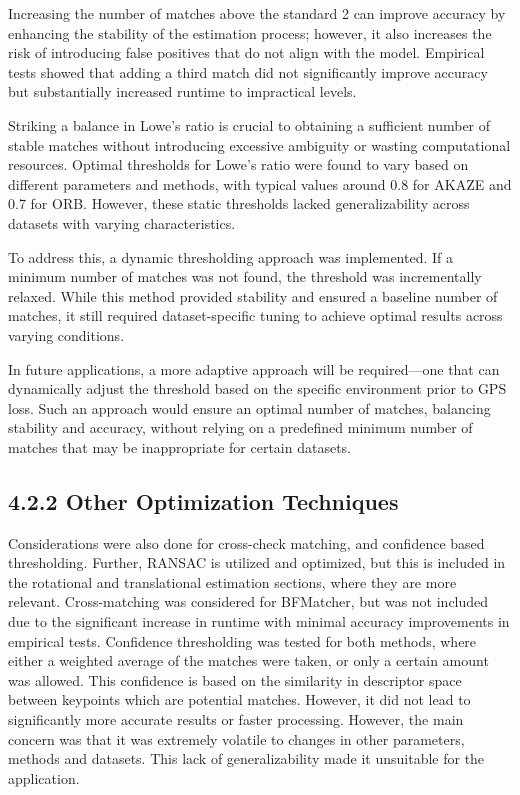 Increasing the number of matches above the standard 2 can improve accuracy by enhancing the stability of the estimation process; however, it also increases the risk of introducing false positives that do not align with the model. Empirical tests showed that adding a third match did not significantly improve accuracy but substantially increased runtime to impractical levels.

Striking a balance in Lowe’s ratio is crucial to obtaining a sufficient number of stable matches without introducing excessive ambiguity or wasting computational resources. Optimal thresholds for Lowe’s ratio were found to vary based on different parameters and methods, with typical values around 0.8 for AKAZE and 0.7 for ORB. However, these static thresholds lacked generalizability across datasets with varying characteristics.

To address this, a dynamic thresholding approach was implemented. If a minimum number of matches was not found, the threshold was incrementally relaxed. While this method provided stability and ensured a baseline number of matches, it still required dataset-specific tuning to achieve optimal results across varying conditions.

In future applications, a more adaptive approach will be required—one that can dynamically adjust the threshold based on the specific environment prior to GPS loss. Such an approach would ensure an optimal number of matches, balancing stability and accuracy, without relying on a predefined minimum number of matches that may be inappropriate for certain datasets.


\subsection*{4.2.2 Other Optimization Techniques}
Considerations were also done for cross-check matching, and confidence based thresholding. Further, RANSAC is utilized and optimized, but this is included in the rotational and translational estimation sections, where they are more relevant. 
Cross-matching was considered for BFMatcher, but was not included due to the significant increase in runtime with minimal accuracy improvements in empirical tests. 
Confidence thresholding was tested for both methods, where either a weighted average of the matches were taken, or only a certain amount was allowed. This confidence is based on the similarity in descriptor space between keypoints which are potential matches. However, it did not lead to significantly more accurate results or faster processing. However, the main concern was that it was extremely volatile to changes in other parameters, methods and datasets. This lack of generalizability made it unsuitable for the application.







